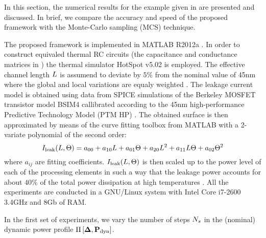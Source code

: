 In this section, the numerical results for the example given in  are presented and discussed. In brief, we compare the accuracy and speed of the proposed framework with the Monte-Carlo sampling (MCS) technique.

The proposed framework is implemented in MATLAB R2012a \cite{matlab}. In order to construct equivaled thermal RC circuits (the capacitance and conductance matrices in ) the thermal simulator HotSpot v5.02 \cite{hotspot} is employed. The effective channel length $L$ is assumend to deviate by $5\%$ from the nominal value of 45nm where the global and local variations are equaly weighted \cite{juan2012}. The leakage current model is obtained using data from SPICE simulations of the Berkeley MOSFET transistor model BSIM4 \cite{bsim4} callibrated according to the 45nm high-performance Predictive Technology Model (PTM HP) \cite{ptm}. The obtained surface is then approximated by means of the curve fitting toolbox from MATLAB with a 2-variate polynomial of the second order:
\[
  I_{\text{leak}}(L, \Theta) = a_{00} + a_{10} L + a_{01} \Theta + a_{20} L^2 + a_{11} L \Theta + a_{02} \Theta^2
\]
where $a_{ij}$ are fitting coefficients. $I_{\text{leak}}(L, \Theta)$ is then scaled up to the power level of each of the processing elements in such a way that the leakage power accounts for about $40\%$ of the total power dissipation at high temperatures \cite{liu2007}. All the experiments are conducted in a GNU/Linux system with Intel Core i7-2600 3.4GHz and 8Gb of RAM.

In the first set of experiments, we vary the number of steps ${N_s}$ in the (nominal) dynamic power profile $\prof{\mP_\dyn}$.
